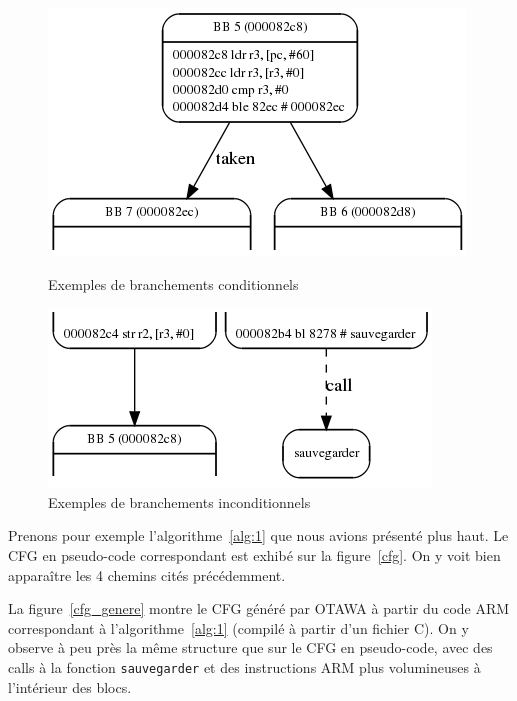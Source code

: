 \documentclass[french]{article}
\begin{document}
  \begin{figure}
    \begin{minipage}[c]{.46\linewidth}
      \includegraphics[scale=0.5]{./pictures/conditional_branch.png}
      \caption{Exemples de branchements conditionnels}
      \label{branchement conditionnel}
   \end{minipage} \hfill
   \begin{minipage}[c]{.46\linewidth}
      \includegraphics[scale=0.5]{./pictures/incoditional_branch.png}
      \caption{Exemples de branchements inconditionnels}
      \label{branchement inconditionnel}
   \end{minipage}
\end{figure}

  
  \bigbreak
  
  Prenons pour exemple l'algorithme~\ref{alg:1} que nous avions présenté plus haut. Le CFG en pseudo-code correspondant est exhibé sur la figure~\ref{cfg}. On y voit bien apparaître les 4 chemins cités précédemment. %
  
  La figure~\ref{cfg_genere} montre le CFG généré par OTAWA à partir du code ARM correspondant à l'algorithme~\ref{alg:1} (compilé à partir d'un fichier C). On y observe à peu près la même structure que sur le CFG en pseudo-code, avec des calls à la fonction \texttt{sauvegarder} et des instructions ARM plus volumineuses à l'intérieur des blocs.
  
\end{document}
